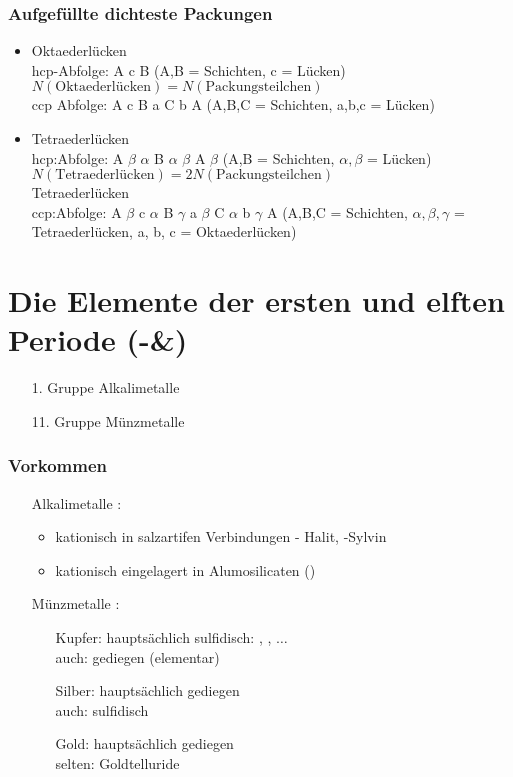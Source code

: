 \documentclass{article}
\begin{document}
\subsubsection{Aufgefüllte dichteste Packungen}
\begin{itemize}
    \item Oktaederlücken\\hcp-Abfolge: A c B (A,B = Schichten, c = Lücken)\\$N(\mathrm{Oktaederl\text{ü}cken})=N(\mathrm{Packungsteilchen})$\\
            ccp Abfolge: A c B a C b A (A,B,C = Schichten, a,b,c = Lücken)
    \item Tetraederlücken\\hcp:Abfolge: A $\beta$ $\alpha$ B $\alpha$ $\beta$ A $\beta$ (A,B = Schichten, $\alpha, \beta$ = Lücken)\\$N(\mathrm{Tetraederl\text{ü}cken})=2N(\mathrm{Packungsteilchen})$\\Tetraederlücken\\
            ccp:Abfolge: A $\beta$ c $\alpha$ B $\gamma$ a $\beta$ C $\alpha$ b $\gamma$ A (A,B,C = Schichten, $\alpha, \beta, \gamma$ = Tetraederlücken, a, b, c = Oktaederlücken)
\end{itemize}

\section{Die Elemente der ersten und elften Periode (-\&)}
\begin{itemize}
    \item[1. Gruppe] Alkalimetalle
    \item[11. Gruppe] Münzmetalle 
\end{itemize}
\subsubsection{Vorkommen}
\begin{itemize}
    \item[Alkalimetalle]:
    \begin{itemize}
        \item kationisch in salzartifen Verbindungen  - Halit,  -Sylvin
        \item kationisch eingelagert in Alumosilicaten ()
    \end{itemize}
    \item[Münzmetalle]:
    \begin{itemize}
        \item[Kupfer:] hauptsächlich sulfidisch: , , $\dots$\\auch: gediegen (elementar)
        \item[Silber:] hauptsächlich gediegen\\auch: sulfidisch
        \item[Gold:] hauptsächlich gediegen\\selten: Goldtelluride  
    \end{itemize}
\end{itemize}
\end{document}
